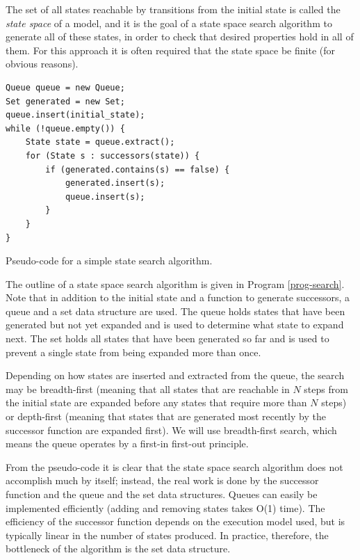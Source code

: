 \documentclass{acm_proc_article-sp}
\begin{document}
The set of all states reachable by transitions from the initial state is called
the \emph{state space} of a model, and it is the goal of a state space search
algorithm to generate all of these states, in order to check that desired
properties hold in all of them. For this approach it is often required that
the state space be finite (for obvious reasons).

\begin{program}
\begin{verbatim}
Queue queue = new Queue;
Set generated = new Set;
queue.insert(initial_state);
while (!queue.empty()) {
    State state = queue.extract();
    for (State s : successors(state)) {
        if (generated.contains(s) == false) {
            generated.insert(s);
            queue.insert(s);
        }
    }
}
\end{verbatim}
\caption{Pseudo-code for a simple state search algorithm.}
\label{prog-search}
\end{program}

The outline of a state space search algorithm is given in Program
\ref{prog-search}. Note that in addition to the initial state and a function
to generate successors, a queue and a set data structure are used. The queue
holds states that have been generated but not yet expanded and is used to
determine what state to expand next. The set holds all states that have been
generated so far and is used to prevent a single state from being expanded
more than once.

Depending on how states are inserted and extracted from the queue, the search
may be breadth-first (meaning that all states that are reachable in $N$ steps
from the initial state are expanded before any states that require more than
$N$ steps) or depth-first (meaning that states that are generated most recently
by the successor function are expanded first). We will use breadth-first
search, which means the queue operates by a first-in first-out principle.

From the pseudo-code it is clear that the state space search algorithm does not
accomplish much by itself; instead, the real work is done by the successor
function and the queue and the set data structures. Queues can easily be
implemented efficiently (adding and removing states takes O(1) time).
The efficiency of the successor function depends on the execution model used,
but is typically linear in the number of states produced. In practice,
therefore, the bottleneck of the algorithm is the set data structure.
\end{document}

